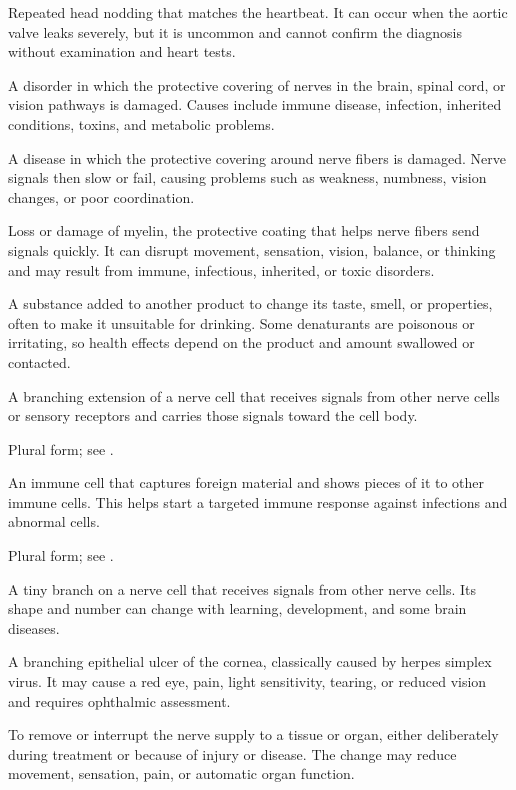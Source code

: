  Repeated head nodding that matches the heartbeat. It can occur when the aortic valve leaks severely, but it is uncommon and cannot confirm the diagnosis without examination and heart tests.

 A disorder in which the protective covering of nerves in the brain, spinal cord, or vision pathways is damaged. Causes include immune disease, infection, inherited conditions, toxins, and metabolic problems.

 A disease in which the protective covering around nerve fibers is damaged. Nerve signals then slow or fail, causing problems such as weakness, numbness, vision changes, or poor coordination.

 Loss or damage of myelin, the protective coating that helps nerve fibers send signals quickly. It can disrupt movement, sensation, vision, balance, or thinking and may result from immune, infectious, inherited, or toxic disorders.

 A substance added to another product to change its taste, smell, or properties, often to make it unsuitable for drinking. Some denaturants are poisonous or irritating, so health effects depend on the product and amount swallowed or contacted.

 A branching extension of a nerve cell that receives signals from other nerve cells or sensory receptors and carries those signals toward the cell body.

 Plural form; see .


 An immune cell that captures foreign material and shows pieces of it to other immune cells. This helps start a targeted immune response against infections and abnormal cells.

 Plural form; see .


 A tiny branch on a nerve cell that receives signals from other nerve cells. Its shape and number can change with learning, development, and some brain diseases.

 A branching epithelial ulcer of the cornea, classically caused by herpes simplex virus. It may cause a red eye, pain, light sensitivity, tearing, or reduced vision and requires ophthalmic assessment.

 To remove or interrupt the nerve supply to a tissue or organ, either deliberately during treatment or because of injury or disease. The change may reduce movement, sensation, pain, or automatic organ function.

